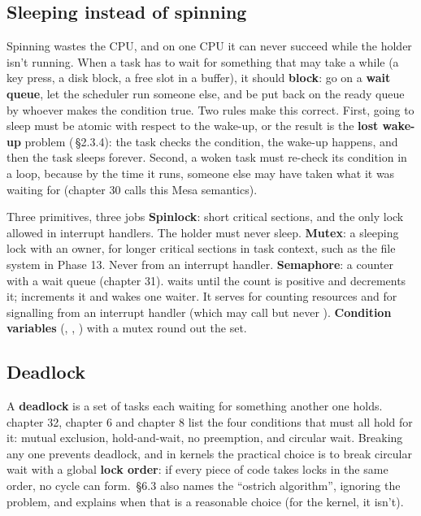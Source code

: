 \documentclass[11pt,a4paper]{article}
\begin{document}
\subsection{Sleeping instead of spinning}

Spinning wastes the CPU, and on one CPU it can never succeed while the holder isn't running. When a task has to wait
for something that may take a while (a key press, a disk block, a free slot in a buffer), it should \textbf{block}:
go on a \textbf{wait queue}, let the scheduler run someone else, and be put back on the ready queue by whoever
makes the condition true. Two rules make this correct. First, going to sleep must be atomic with respect to the
wake-up, or the result is the \textbf{lost wake-up} problem (\MOS\,\S2.3.4): the task checks the condition, the wake-up
happens, and then the task sleeps forever. Second, a woken task must re-check its condition in a  loop,
because by the time it runs, someone else may have taken what it was waiting for (\OSTEP chapter 30 calls this Mesa
semantics).

\begin{conceptbox}{Three primitives, three jobs}
\textbf{Spinlock}: short critical sections, and the only lock allowed in interrupt handlers. The holder must never
sleep. \textbf{Mutex}: a sleeping lock with an owner, for longer critical sections in task context, such as the
file system in Phase 13. Never from an interrupt handler. \textbf{Semaphore}: a counter with a wait queue
(\OSTEP chapter 31).  waits until the count is positive and decrements it;  increments it and
wakes one waiter. It serves for counting resources and for signalling from an interrupt handler (which may call
 but never ). \textbf{Condition variables} (, , ) with a
mutex round out the set.
\end{conceptbox}

\subsection{Deadlock}

A \textbf{deadlock} is a set of tasks each waiting for something another one holds. \OSTEP chapter 32, \MOS chapter 6
and \OSC chapter 8 list the four conditions that must all hold for it: mutual exclusion, hold-and-wait, no preemption,
and circular wait. Breaking any one prevents deadlock, and in kernels the practical choice is to break circular wait
with a global \textbf{lock order}: if every piece of code takes locks in the same order, no cycle can form. \MOS\,\S6.3
also names the ``ostrich algorithm'', ignoring the problem, and explains when that is a reasonable choice (for the
kernel, it isn't).
\end{document}
